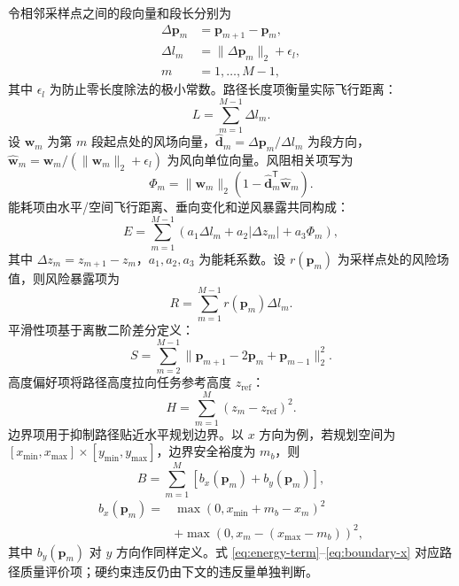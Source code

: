 令相邻采样点之间的段向量和段长分别为
\begin{equation}
    \begin{aligned}
    \Delta \mathbf{p}_m
    &= \mathbf{p}_{m+1}-\mathbf{p}_m,\\
    \Delta l_m
    &= \|\Delta \mathbf{p}_m\|_2+\epsilon_l,\\
    m&=1,\ldots,M-1,
    \end{aligned}
    \label{eq:segment-definition}
\end{equation}
其中 $\epsilon_l$ 为防止零长度除法的极小常数。路径长度项衡量实际飞行距离：
\begin{equation}
    L=\sum_{m=1}^{M-1}\Delta l_m .
    \label{eq:path-length}
\end{equation}
设 $\mathbf{w}_m$ 为第 $m$ 段起点处的风场向量，$\widehat{\mathbf d}_m=\Delta\mathbf p_m/\Delta l_m$ 为段方向，$\widehat{\mathbf w}_m=\mathbf w_m/(\|\mathbf w_m\|_2+\epsilon_l)$ 为风向单位向量。风阻相关项写为
\begin{equation}
    \Phi_m=\|\mathbf w_m\|_2
    \left(1-\widehat{\mathbf d}_m^\mathsf{T}\widehat{\mathbf w}_m\right).
    \label{eq:wind-alignment}
\end{equation}
能耗项由水平/空间飞行距离、垂向变化和逆风暴露共同构成：
\begin{equation}
    E=\sum_{m=1}^{M-1}
    \left(
    a_1\Delta l_m+a_2|\Delta z_m|+a_3\Phi_m
    \right),
    \label{eq:energy-term}
\end{equation}
其中 $\Delta z_m=z_{m+1}-z_m$，$a_1,a_2,a_3$ 为能耗系数。设 $r(\mathbf p_m)$ 为采样点处的风险场值，则风险暴露项为
\begin{equation}
    R=\sum_{m=1}^{M-1}r(\mathbf p_m)\Delta l_m .
    \label{eq:risk-term}
\end{equation}
平滑性项基于离散二阶差分定义：
\begin{equation}
    S=\sum_{m=2}^{M-1}
    \|\mathbf p_{m+1}-2\mathbf p_m+\mathbf p_{m-1}\|_2^2 .
    \label{eq:smoothness-term}
\end{equation}
高度偏好项将路径高度拉向任务参考高度 $z_{\mathrm{ref}}$：
\begin{equation}
    H=\sum_{m=1}^{M}(z_m-z_{\mathrm{ref}})^2 .
    \label{eq:height-term}
\end{equation}
边界项用于抑制路径贴近水平规划边界。以 $x$ 方向为例，若规划空间为 $[x_{\min},x_{\max}]\times[y_{\min},y_{\max}]$，边界安全裕度为 $m_b$，则
\begin{equation}
    B=\sum_{m=1}^{M}
    \left[
    b_x(\mathbf p_m)+b_y(\mathbf p_m)
    \right],
    \label{eq:boundary-term}
\end{equation}
\begin{equation}
    \begin{aligned}
    b_x(\mathbf p_m)
    ={}&
    \max(0,x_{\min}+m_b-x_m)^2\\
    &+
    \max(0,x_m-(x_{\max}-m_b))^2,
    \end{aligned}
    \label{eq:boundary-x}
\end{equation}
其中 $b_y(\mathbf p_m)$ 对 $y$ 方向作同样定义。式 \eqref{eq:energy-term}--\eqref{eq:boundary-x} 对应路径质量评价项；硬约束违反仍由下文的违反量单独判断。

